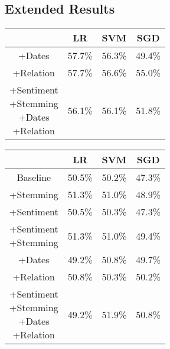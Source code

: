 \documentclass[11pt,a4paper]{article}
\begin{document}
\subsection{Extended Results}

\begin{center}
\begin{tabular}{ |c|c|c|c| }
 \hline
  & LR & SVM & SGD \\
 \hline
 +Dates & 57.7\% & 56.3\% & 49.4\% \\
  \hline
 +Relation & 57.7\% & 56.6\% & 55.0\% \\
  \hline
  \shortstack{+Sentiment \\ +Stemming \\+Dates \\+Relation} & 56.1\% & 56.1\% & 51.8\% \\
 \hline
\end{tabular}
\end{center}

\begin{center}
\begin{tabular}{ |c|c|c|c| }
 \hline
  & LR & SVM & SGD \\
  \hline
  Baseline & 50.5\% & 50.2\% & 47.3\% \\
  \hline
 +Stemming & 51.3\% & 51.0\% & 48.9\% \\
  \hline
 +Sentiment & 50.5\% & 50.3\%  & 47.3\% \\
  \hline
  \shortstack{+Sentiment \\ +Stemming} & 51.3\% & 51.0\% & 49.4\% \\
 \hline
 +Dates & 49.2\% & 50.8\% & 49.7\% \\
  \hline
 +Relation & 50.8\% & 50.3\% & 50.2\% \\
  \hline
  \shortstack{+Sentiment \\ +Stemming \\+Dates \\+Relation} & 49.2\% & 51.9\% & 50.8\% \\
 \hline
\end{tabular}
\end{center}
\end{document}
